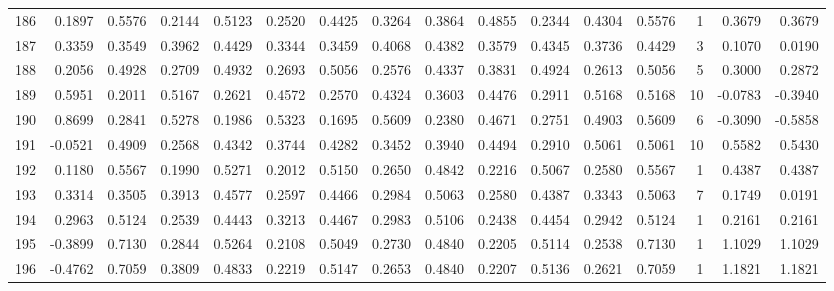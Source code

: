 \begin{tabular}{lrrrrrrrrrrrrrrr}
186 &      0.1897 &  0.5576 &  0.2144 &  0.5123 &  0.2520 &  0.4425 &  0.3264 &  0.3864 &  0.4855 &  0.2344 &   0.4304 &     0.5576 &      1 &                    0.3679 &                     0.3679 \\
187 &      0.3359 &  0.3549 &  0.3962 &  0.4429 &  0.3344 &  0.3459 &  0.4068 &  0.4382 &  0.3579 &  0.4345 &   0.3736 &     0.4429 &      3 &                    0.1070 &                     0.0190 \\
188 &      0.2056 &  0.4928 &  0.2709 &  0.4932 &  0.2693 &  0.5056 &  0.2576 &  0.4337 &  0.3831 &  0.4924 &   0.2613 &     0.5056 &      5 &                    0.3000 &                     0.2872 \\
189 &      0.5951 &  0.2011 &  0.5167 &  0.2621 &  0.4572 &  0.2570 &  0.4324 &  0.3603 &  0.4476 &  0.2911 &   0.5168 &     0.5168 &     10 &                   -0.0783 &                    -0.3940 \\
190 &      0.8699 &  0.2841 &  0.5278 &  0.1986 &  0.5323 &  0.1695 &  0.5609 &  0.2380 &  0.4671 &  0.2751 &   0.4903 &     0.5609 &      6 &                   -0.3090 &                    -0.5858 \\
191 &     -0.0521 &  0.4909 &  0.2568 &  0.4342 &  0.3744 &  0.4282 &  0.3452 &  0.3940 &  0.4494 &  0.2910 &   0.5061 &     0.5061 &     10 &                    0.5582 &                     0.5430 \\
192 &      0.1180 &  0.5567 &  0.1990 &  0.5271 &  0.2012 &  0.5150 &  0.2650 &  0.4842 &  0.2216 &  0.5067 &   0.2580 &     0.5567 &      1 &                    0.4387 &                     0.4387 \\
193 &      0.3314 &  0.3505 &  0.3913 &  0.4577 &  0.2597 &  0.4466 &  0.2984 &  0.5063 &  0.2580 &  0.4387 &   0.3343 &     0.5063 &      7 &                    0.1749 &                     0.0191 \\
194 &      0.2963 &  0.5124 &  0.2539 &  0.4443 &  0.3213 &  0.4467 &  0.2983 &  0.5106 &  0.2438 &  0.4454 &   0.2942 &     0.5124 &      1 &                    0.2161 &                     0.2161 \\
195 &     -0.3899 &  0.7130 &  0.2844 &  0.5264 &  0.2108 &  0.5049 &  0.2730 &  0.4840 &  0.2205 &  0.5114 &   0.2538 &     0.7130 &      1 &                    1.1029 &                     1.1029 \\
196 &     -0.4762 &  0.7059 &  0.3809 &  0.4833 &  0.2219 &  0.5147 &  0.2653 &  0.4840 &  0.2207 &  0.5136 &   0.2621 &     0.7059 &      1 &                    1.1821 &                     1.1821 \\

\end{tabular}
